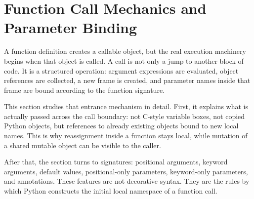 \section{Function Call Mechanics and Parameter Binding}

A function definition creates a callable object, but the real execution machinery begins when that object is called. A call is not only a jump to another block of code. It is a structured operation: argument expressions are evaluated, object references are collected, a new frame is created, and parameter names inside that frame are bound according to the function signature.

This section studies that entrance mechanism in detail. First, it explains what is actually passed across the call boundary: not C-style variable boxes, not copied Python objects, but references to already existing objects bound to new local names. This is why reassignment inside a function stays local, while mutation of a shared mutable object can be visible to the caller.

After that, the section turns to signatures: positional arguments, keyword arguments, default values, positional-only parameters, keyword-only parameters, and annotations. These features are not decorative syntax. They are the rules by which Python constructs the initial local namespace of a function call.